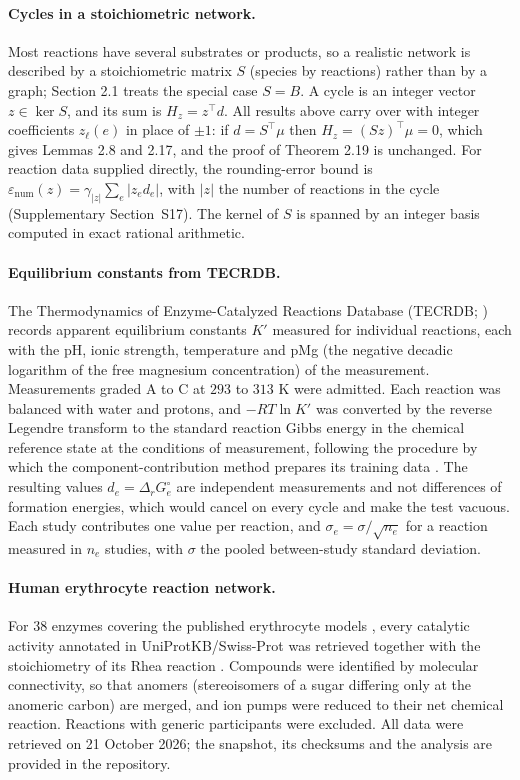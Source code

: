\documentclass[11pt,a4paper]{article}
\theoremstyle{pstyle}
\theoremstyle{definition}
\theoremstyle{remark}
\newcommand{\abs}[1]{\lvert#1\rvert}
\newcommand{\eps}{\varepsilon}
\newcommand{\epsnum}{\eps_{\mathrm{num}}}
\newcommand{\hol}{H}
\begin{document}
\paragraph{Cycles in a stoichiometric network.} Most reactions have
several substrates or products, so a realistic network is described by
a stoichiometric matrix $S$ (species by reactions) rather than by a
graph; Section 2.1 treats the special case $S=B$. A cycle is an
integer vector $z\in\ker S$, and its sum is $\hol_z=z^{\top}d$. All
results above carry over with integer coefficients $z_\ell(e)$ in place
of $\pm1$: if $d=S^{\top}\mu$ then $\hol_z=(Sz)^{\top}\mu=0$, which gives
Lemmas 2.8 and 2.17, and the proof of
Theorem 2.19 is unchanged. For reaction data supplied directly,
the rounding-error bound is
$\epsnum(z)=\gamma_{\abs{z}}\sum_e\abs{z_e d_e}$, with $\abs{z}$ the
number of reactions in the cycle (Supplementary Section~S17). The kernel
of $S$ is spanned by an integer basis computed in exact rational
arithmetic.

\paragraph{Equilibrium constants from TECRDB.} The Thermodynamics of
Enzyme-Catalyzed Reactions Database (TECRDB; \citealp{goldberg2004})
records apparent equilibrium constants $K'$ measured for individual
reactions, each with the pH, ionic strength, temperature and pMg (the
negative decadic logarithm of the free magnesium concentration) of the
measurement. Measurements graded A to C at $293$ to $313$ K were
admitted. Each reaction was balanced with water and protons, and
$-RT\ln K'$ was converted by the reverse Legendre transform to the
standard reaction Gibbs energy in the chemical reference state at the
conditions of measurement, following the procedure by which the
component-contribution method prepares its training data
\citep{noor2013,beber2022}. The resulting values
$d_e=\Delta_rG^{\circ}_e$ are independent measurements and not
differences of formation energies, which would cancel on every cycle
and make the test vacuous. Each study contributes one value per
reaction, and $\sigma_e=\sigma/\sqrt{n_e}$ for a reaction measured in
$n_e$ studies, with $\sigma$ the pooled between-study standard
deviation.

\paragraph{Human erythrocyte reaction network.} For $38$ enzymes
covering the published erythrocyte models \citep{mulquiney1999}, every
catalytic activity annotated in UniProtKB/Swiss-Prot
\citep{uniprot2025} was retrieved together with the stoichiometry of its
Rhea reaction \citep{bansal2022}. Compounds were identified by molecular
connectivity, so that anomers (stereoisomers of a sugar differing only
at the anomeric carbon) are merged, and ion pumps were reduced to their
net chemical reaction. Reactions with generic participants were
excluded. All data were retrieved on 21 October 2026; the snapshot, its
checksums and the analysis are provided in the repository.
\end{document}
